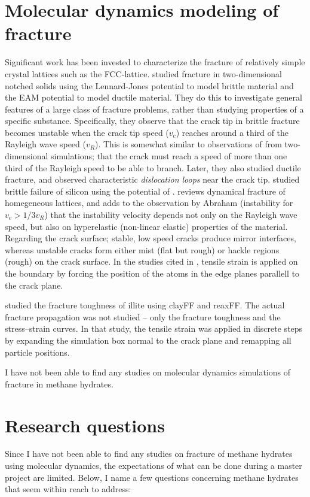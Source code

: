\section{Molecular dynamics modeling of fracture}
Significant work has been invested to characterize the fracture of relatively simple crystal lattices such as the FCC-lattice. \citet{Abraham19971595} studied fracture in two-dimensional notched solids using the Lennard-Jones potential to model brittle material and the EAM potential \cite{PhysRevB.29.6443} to model ductile material. They do this to investigate general features of a large class of fracture problems, rather than studying properties of a specific substance. Specifically, they observe that the crack tip in brittle fracture becomes unstable when the crack tip speed ($v_c$) reaches around a third of the Rayleigh wave speed ($v_R$). This is somewhat similar to observations of \citet{PhysRevLett.76.2318} from two-dimensional simulations; that the crack must reach a speed of more than one third of the Rayleigh speed to be able to branch. Later, they also studied ductile fracture, and observed characteristic \emph{dislocation loops} near the crack tip. \citet{PhysRevLett.80.746} studied brittle failure of silicon using the potential of \citet{Stillinger1985}. \citet[ch. 6]{doi:10.1142/9789812773326_0001} reviews dynamical fracture of homegeneous lattices, and adds to the observation by Abraham (instability for $v_c > 1/3 v_R$) that the instability velocity depends not only on the Rayleigh wave speed, but also on hyperelastic (non-linear elastic) properties of the material. Regarding the crack surface; stable, low speed cracks produce mirror interfaces, whereas unstable cracks form either mist (flat but rough) or hackle regions (rough) on the crack surface. In the studies cited in \citet[ch. 6]{doi:10.1142/9789812773326_0001}, tensile strain is applied on the boundary by forcing the position of the atoms in the edge planes parallell to the crack plane. 

\citet{Hantal2014} studied the fracture toughness of illite using clayFF and reaxFF. The actual fracture propagation was not studied -- only the fracture toughness and the stress--strain curves. In that study, the tensile strain was applied in discrete steps by expanding the simulation box normal to the crack plane and remapping all particle positions.

I have not been able to find any studies on molecular dynamics simulations of fracture in methane hydrates.


\section{Research questions}
\label{sec:research_questions}
Since I have not been able to find any studies on fracture of methane hydrates using molecular dynamics, the expectations of what can be done during a master project are limited. Below, I name a few questions concerning methane hydrates that seem within reach to address:

